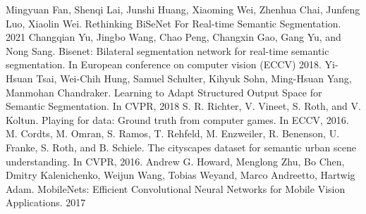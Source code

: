 \documentclass[conference]{IEEEtran}
\begin{document}
\begin{thebibliography}{00}
 Mingyuan Fan, Shenqi Lai, Junshi Huang, Xiaoming Wei, Zhenhua Chai, Junfeng Luo, Xiaolin Wei. Rethinking BiSeNet For Real-time Semantic Segmentation. 2021
 Changqian Yu, Jingbo Wang, Chao Peng, Changxin Gao, Gang Yu, and Nong Sang. Bisenet: Bilateral segmentation network for real-time semantic segmentation. In European conference on computer vision (ECCV) 2018.
 Yi-Hsuan Tsai, Wei-Chih Hung, Samuel Schulter, Kihyuk Sohn, Ming-Hsuan Yang, Manmohan Chandraker. Learning to Adapt Structured Output Space for Semantic Segmentation. In CVPR, 2018
 S. R. Richter, V. Vineet, S. Roth, and V. Koltun. Playing for data: Ground truth from computer games. In ECCV, 2016.
 M. Cordts, M. Omran, S. Ramos, T. Rehfeld, M. Enzweiler, R. Benenson, U. Franke, S. Roth, and B. Schiele. The cityscapes dataset for semantic urban scene understanding. In CVPR, 2016. 
 Andrew G. Howard, Menglong Zhu, Bo Chen, Dmitry Kalenichenko, Weijun Wang, Tobias Weyand, Marco Andreetto, Hartwig Adam. MobileNets: Efficient Convolutional Neural Networks for Mobile Vision Applications. 2017
\end{thebibliography}
\vspace{12pt}
\end{document}
